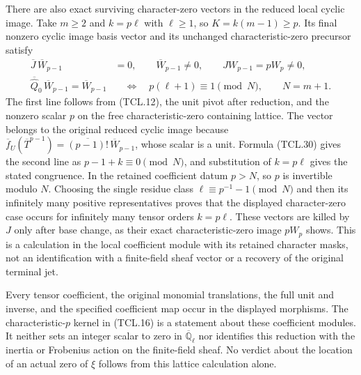 There are also exact surviving character-zero vectors in the
reduced local cyclic image. Take \(m\geq2\) and \(k=p\ell\) with
\(\ell\geq1\), so \(K=k(m-1)\geq p\). Its final nonzero cyclic
image basis vector and its unchanged characteristic-zero precursor
satisfy
\[
 \begin{split}
 \overline J\,\overline W_{p-1}&=0,\qquad
       \overline W_{p-1}\ne0,\qquad J W_{p-1}=pW_p\ne0,\\
 \overline{\widehat Q}_0\,\overline W_{p-1}=\overline W_{p-1}
       &\quad\Longleftrightarrow\quad
       p(\ell+1)\equiv1\pmod{N},\qquad N=m+1 .
 \end{split}
 \tag{TCL.37}\label{CFStage:eq:tcl-surviving-character}
\]
The first line follows from (TCL.12), the unit pivot after
reduction, and the nonzero scalar \(p\) on the free
characteristic-zero containing lattice. The vector belongs to
the original reduced cyclic image because
\(\overline f_U(\overline T^{p-1})
 =\overline{(p-1)!}\,\overline W_{p-1}\), whose scalar is a
unit. Formula (TCL.30) gives the second line as
\(p-1+k\equiv0\pmod N\), and substitution of \(k=p\ell\)
gives the stated congruence. In the retained coefficient datum
\(p>N\), so \(p\) is invertible modulo \(N\). Choosing the
single residue class
\(\ell\equiv p^{-1}-1\pmod N\) and then its infinitely many
positive representatives proves that the displayed character-zero
case occurs for infinitely many tensor orders \(k=p\ell\).
These vectors are killed by \(J\) only after base change, as
their exact characteristic-zero image \(pW_p\) shows. This is
a calculation in the local coefficient module with its retained
character masks, not an identification with a finite-field
sheaf vector or a recovery of the original terminal jet.

Every tensor coefficient, the original monomial translations, the
full unit and inverse, and the specified coefficient map occur in
the displayed morphisms. The characteristic-\(p\) kernel in
(TCL.16) is a statement about these coefficient modules. It neither
sets an integer scalar to zero in \(\overline{\mathbb Q}_\ell\)
nor identifies this reduction with the inertia or Frobenius action
on the finite-field sheaf. No verdict about the location of an
actual zero of \(\xi\) follows from this lattice calculation alone.


